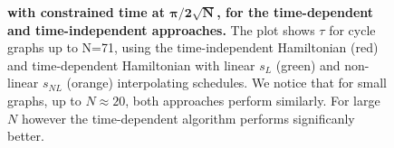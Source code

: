 \begin{figure}[ht]
  \centering
  \caption{\textbf{\bm{$\tau$} with constrained time at $\bm{\pi/2\sqrt{N}}$, for the time-dependent and time-independent approaches.} The plot shows $\tau$ for cycle graphs up to N=71, using the time-independent Hamiltonian (red) and time-dependent Hamiltonian with linear $s_L$ (green) and non-linear $s_{NL}$ (orange) interpolating schedules. We notice that for small graphs, up to $N\approx 20$, both approaches perform similarly. For large $N$ however the time-dependent algorithm performs significanly better.}
  \label{fig:tau_independent_dependent}
\end{figure}
